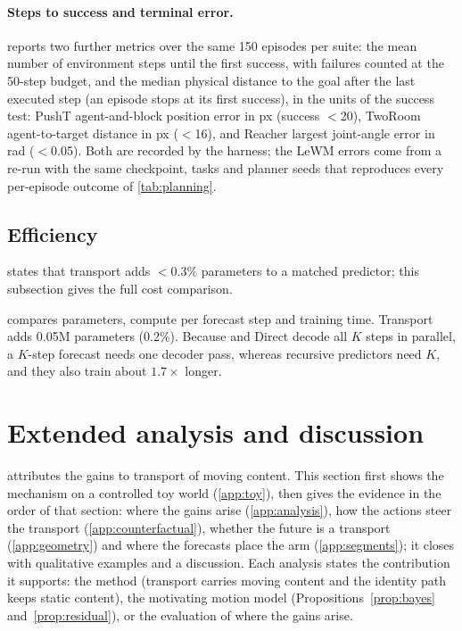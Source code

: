 \paragraph{Steps to success and terminal error.}  reports two further metrics over the same
150 episodes per suite: the mean number of environment steps until the first success, with failures counted at the
50-step budget, and the median physical distance to the goal after the last executed step (an episode stops at its
first success), in the units of the success test: PushT agent-and-block position error in px (success $<$20), TwoRoom
agent-to-target distance in px ($<$16), and Reacher largest joint-angle error in rad ($<$0.05). Both are recorded by the harness; the LeWM errors come from a re-run with the same checkpoint, tasks and
planner seeds that reproduces every per-episode outcome of \cref{tab:planning}.


\FloatBarrier
\subsection{Efficiency}\label{app:cost}
 states that transport adds $<\!0.3\%$ parameters to a matched predictor; this subsection gives the full
cost comparison.

 compares parameters, compute per forecast step and
training time. Transport adds 0.05M parameters (0.2\%). Because \ours{} and Direct decode all $K$ steps in
parallel, a $K$-step forecast needs one decoder pass, whereas recursive predictors need $K$, and they also train about
$1.7{\times}$ longer.


\FloatBarrier
\section{Extended analysis and discussion}\label{app:analysis-all}
 attributes the gains to transport of moving content. This section first shows the mechanism on a controlled toy world (\cref{app:toy}), then gives the
evidence in the order of that section: where the gains arise (\cref{app:analysis}), how the actions steer the transport
(\cref{app:counterfactual}), whether the future is a transport (\cref{app:geometry}) and where the forecasts place the
arm (\cref{app:segments}); it closes with qualitative examples and a discussion. Each analysis states the contribution
it supports: the method (transport carries moving content and the identity path keeps static content), the
motivating motion model (Propositions~\ref{prop:bayes} and~\ref{prop:residual}), or the
evaluation of where the gains arise.

